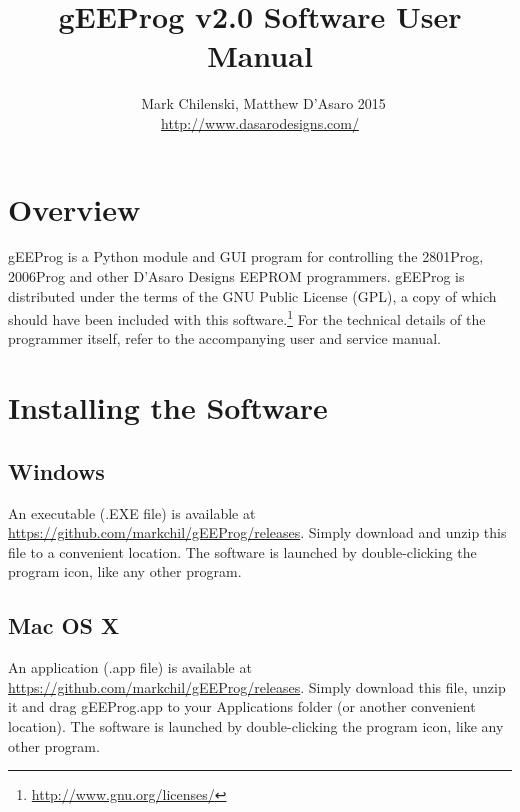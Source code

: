 \documentclass[letter]{article}
\title{gEEProg v2.0 Software User Manual}
\author{\textcopyright\ Mark Chilenski, Matthew D'Asaro 2015\\\url{http://www.dasarodesigns.com/}}
\begin{document}
\maketitle

\section{Overview}
gEEProg is a Python module and GUI program for controlling the 2801Prog, 2006Prog and other D'Asaro Designs EEPROM programmers.
gEEProg is distributed under the terms of the GNU Public License (GPL), a copy of which should have been included with this software.\footnote{\url{http://www.gnu.org/licenses/}}
For the technical details of the programmer itself, refer to the accompanying user and service manual.

\section{Installing the Software}
\subsection{Windows}
An executable (.EXE file) is available at \url{https://github.com/markchil/gEEProg/releases}.
Simply download and unzip this file to a convenient location.
The software is launched by double-clicking the program icon, like any other program.

\subsection{Mac OS X}
An application (.app file) is available at \url{https://github.com/markchil/gEEProg/releases}.
Simply download this file, unzip it and drag gEEProg.app to your Applications folder (or another convenient location).
The software is launched by double-clicking the program icon, like any other program.
\end{document}

